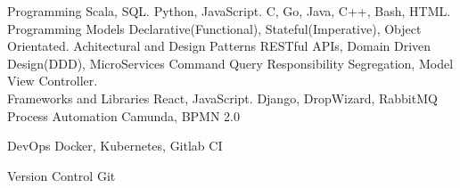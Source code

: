 

\begin{cvskills}
  \cvskill
    {Programming} %
    {  Scala, SQL.} 
  \cvskill
    {} %
    {  Python, JavaScript. } 
  \cvskill
    {} %
    {  C, Go, Java, C++, Bash, HTML.} 
  \\
  \cvskill
    {Programming Models} %
    { Declarative(Functional), Stateful(Imperative), Object Orientated.} 
  \cvskill
    {Achitectural and Design Patterns} %
    {  RESTful APIs, Domain Driven Design(DDD), MicroServices}
    \cvskill
    {} %
    {  Command Query Responsibility Segregation, Model View Controller.} 
  \\
  \cvskill
    {Frameworks and Libraries} %
    {  React, JavaScript. } 
  \cvskill
    {} %
    {  Django, DropWizard, RabbitMQ} 
  \\
  \cvskill
    {Process Automation}
    { Camunda, BPMN 2.0}

  \cvskill
    {DevOps} %
    { Docker, Kubernetes, Gitlab CI} %

  \cvskill
  {Version Control} %
  { Git} %

\end{cvskills}
